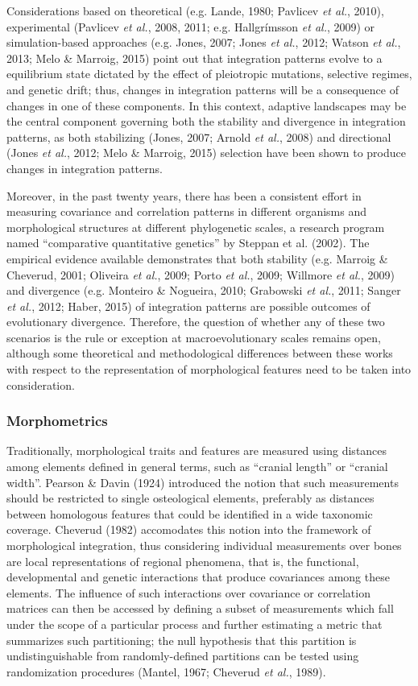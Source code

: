 \documentclass[12pt,]{article}
\begin{document}
Considerations based on theoretical (e.g. Lande, 1980; Pavlicev \emph{et
al.}, 2010), experimental (Pavlicev \emph{et al.}, 2008, 2011; e.g.
Hallgrímsson \emph{et al.}, 2009) or simulation-based approaches (e.g.
Jones, 2007; Jones \emph{et al.}, 2012; Watson \emph{et al.}, 2013; Melo
\& Marroig, 2015) point out that integration patterns evolve to a
equilibrium state dictated by the effect of pleiotropic mutations,
selective regimes, and genetic drift; thus, changes in integration
patterns will be a consequence of changes in one of these components. In
this context, adaptive landscapes may be the central component governing
both the stability and divergence in integration patterns, as both
stabilizing (Jones, 2007; Arnold \emph{et al.}, 2008) and directional
(Jones \emph{et al.}, 2012; Melo \& Marroig, 2015) selection have been
shown to produce changes in integration patterns.

Moreover, in the past twenty years, there has been a consistent effort
in measuring covariance and correlation patterns in different organisms
and morphological structures at different phylogenetic scales, a
research program named ``comparative quantitative genetics'' by Steppan
et al. (2002). The empirical evidence available demonstrates that both
stability (e.g. Marroig \& Cheverud, 2001; Oliveira \emph{et al.}, 2009;
Porto \emph{et al.}, 2009; Willmore \emph{et al.}, 2009) and divergence
(e.g. Monteiro \& Nogueira, 2010; Grabowski \emph{et al.}, 2011; Sanger
\emph{et al.}, 2012; Haber, 2015) of integration patterns are possible
outcomes of evolutionary divergence. Therefore, the question of whether
any of these two scenarios is the rule or exception at macroevolutionary
scales remains open, although some theoretical and methodological
differences between these works with respect to the representation of
morphological features need to be taken into consideration.

\subsubsection{Morphometrics}\label{morphometrics}

Traditionally, morphological traits and features are measured using
distances among elements defined in general terms, such as ``cranial
length'' or ``cranial width''. Pearson \& Davin (1924) introduced the
notion that such measurements should be restricted to single
osteological elements, preferably as distances between homologous
features that could be identified in a wide taxonomic coverage. Cheverud
(1982) accomodates this notion into the framework of morphological
integration, thus considering individual measurements over bones are
local representations of regional phenomena, that is, the functional,
developmental and genetic interactions that produce covariances among
these elements. The influence of such interactions over covariance or
correlation matrices can then be accessed by defining a subset of
measurements which fall under the scope of a particular process and
further estimating a metric that summarizes such partitioning; the null
hypothesis that this partition is undistinguishable from
randomly-defined partitions can be tested using randomization procedures
(Mantel, 1967; Cheverud \emph{et al.}, 1989).
\end{document}
